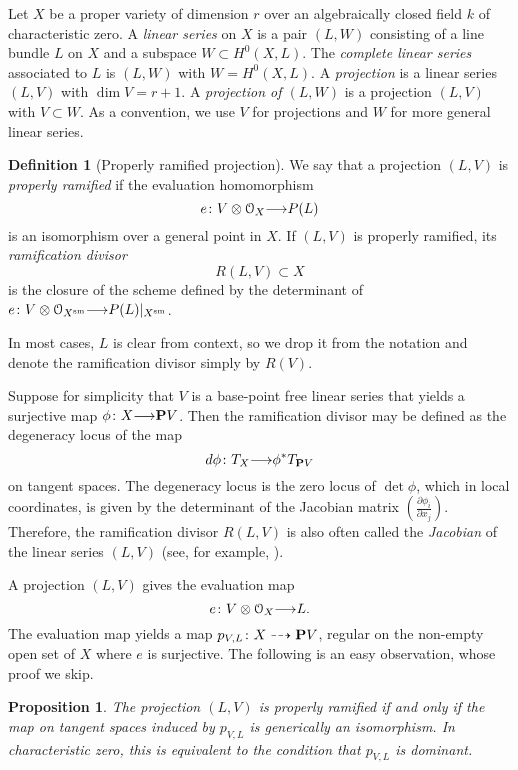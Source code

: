 \documentclass[11pt,reqno]{amsart}
\theoremstyle{plain}
\newtheorem{proposition}[theorem]{Proposition}
\theoremstyle{definition}
\newtheorem{definition}[theorem]{Definition}
\theoremstyle{remark}
\numberwithin{equation}{section}
\renewcommand{\to}{{\longrightarrow}}
\numberwithin{equation}{section}
\renewcommand{\O}{\mathcal O}
\begin{document}
Let $X$ be a proper variety of dimension $r$ over an algebraically closed field $k$ of characteristic zero.
A \emph{linear series} on $X$ is a pair $(L, W)$ consisting of a line bundle $L$ on $X$ and a subspace $W \subset H^0(X, L)$.
The \emph{complete linear series} associated to $L$ is $(L, W)$ with $W = H^0(X, L)$.
A \emph{projection} is a linear series $(L, V)$ with $\dim V = r+1$.
A \emph{projection of $(L, W)$} is a projection $(L, V)$ with $V \subset W$.
As a convention, we use $V$ for projections and $W$ for more general linear series.

\begin{definition}[Properly ramified projection]
  \label{def:properlyramified}
We say that a projection $(L,V)$ is \emph{properly ramified} if the evaluation homomorphism
\[e \from V \otimes \O_{X} \to P(L)\]
is an isomorphism over a general point in $X$.  If $(L,V)$ is properly ramified, its \emph{ramification divisor}
\[R(L,V) \subset X\]
is the closure of the scheme defined by the determinant of $e \from V \otimes \O_{X^{\rm sm}} \to P(L)|_{X^{\rm sm}}$.
\end{definition}
In most cases, $L$ is clear from context, so we drop it from the notation and denote the ramification divisor simply by $R(V)$.
\begin{remark}\label{rem:Jacobian}
  Suppose for simplicity that $V$ is a base-point free linear series that yields a surjective map $\phi \from X \to \P V$.
  Then the ramification divisor may be defined as the degeneracy locus of the map
  \[ d \phi \from T_{X} \to \phi^* T_{\P V}\]
  on tangent spaces.
  The degeneracy locus is the zero locus of $\det \phi$, which in local coordinates, is given by the determinant of the Jacobian matrix $\left( \frac{\partial \phi_i}{\partial x_j} \right)$.
  Therefore, the ramification divisor $R(L, V)$ is also often called the \emph{Jacobian} of the linear series $(L, V)$ (see, for example, \cite[1.1.7]{dol:12}).
\end{remark}

A projection $(L, V)$ gives the evaluation map
\[e \from V \otimes \O_X \to L.\]
The evaluation map yields a map $p_{V,L} {\colon} X \dashrightarrow {\bf P} V$, regular on the non-empty open set of $X$ where $e$ is surjective.
The following is an easy observation, whose proof we skip.
\begin{proposition}\label{prop:proj}
  The projection $(L, V)$ is properly ramified if and only if the map on tangent spaces induced by $p_{V,L}$ is generically an isomorphism.
  In characteristic zero, this is equivalent to the condition that $p_{V,L}$ is dominant.
\end{proposition}
\end{document}
